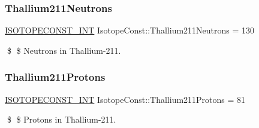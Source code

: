 \subsubsection{\texorpdfstring{Thallium211\+Neutrons}{Thallium211Neutrons}}
{\footnotesize\ttfamily \mbox{\hyperlink{group___isotope_const-_macros_ga5f18360b3e99483a35c32d789e62621c}{I\+S\+O\+T\+O\+P\+E\+C\+O\+N\+S\+T\+\_\+\+I\+NT}} Isotope\+Const\+::\+Thallium211\+Neutrons = 130}

\$ \$ Neutrons in Thallium-\/211. \mbox{\label{group___isotope_const-_thallium-_tl211_gaf2d9c79c88e67434c6981fc96a1e0e2f}} 
\subsubsection{\texorpdfstring{Thallium211\+Protons}{Thallium211Protons}}
{\footnotesize\ttfamily \mbox{\hyperlink{group___isotope_const-_macros_ga5f18360b3e99483a35c32d789e62621c}{I\+S\+O\+T\+O\+P\+E\+C\+O\+N\+S\+T\+\_\+\+I\+NT}} Isotope\+Const\+::\+Thallium211\+Protons = 81}

\$ \$ Protons in Thallium-\/211. 